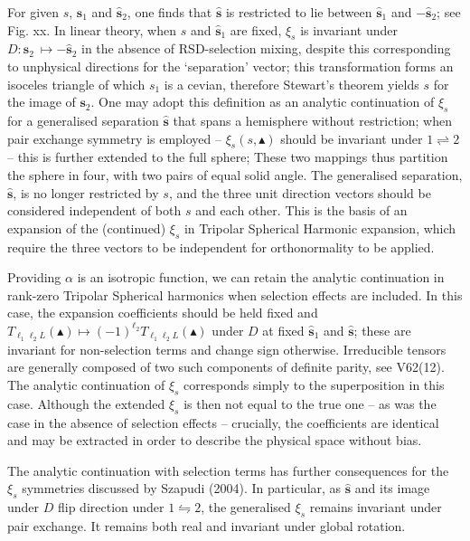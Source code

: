 \documentclass[useAMS,usenatbib]{mn2e}
\begin{document}
For given $s$, $\boldsymbol{\hat s}_1$ and $\boldsymbol{\hat s}_2$, one finds that $\boldsymbol{\hat s}$
is restricted to lie between $\boldsymbol{\hat s}_1$ and $- \boldsymbol{\hat s}_2$; see Fig. xx.  In linear theory, when $s$ and $\boldsymbol{\hat s}_1$ are fixed, $\xi_s$ is invariant under $D: \boldsymbol{\hat s}_2 \ \mapsto - \boldsymbol{\hat s}_2$ in the absence of RSD-selection mixing, despite this corresponding to unphysical directions for the `separation' vector; this transformation forms an isoceles triangle of which $s_1$ is a cevian, therefore Stewart's theorem yields $s$ for the image of $\boldsymbol{s}_2$.  One may adopt this definition as an analytic continuation of $\xi_s$ for a generalised separation $\boldsymbol{\hat s}$ that spans a hemisphere without restriction; when pair exchange symmetry is employed -- $\xi_s(s, \blacktriangle)$ should be invariant under $1 \rightleftharpoons 2$ -- this is further extended to the full sphere; These two mappings thus partition the sphere in four, with two pairs of equal solid angle.  The generalised separation, $\boldsymbol{\hat s}$, is no longer restricted by $s$, and the three unit direction vectors should be considered independent of both $s$ and each other.  This is the basis of an expansion of the (continued) $\xi_s$ in Tripolar Spherical Harmonic expansion, which require the three vectors to be independent for orthonormality to be applied.

Providing $\alpha$ is an isotropic function, we can retain the analytic continuation in rank-zero Tripolar Spherical harmonics when selection effects are included.  In this case, the expansion coefficients should be held fixed and $T_{\ell_1 \ell_2 L}(\blacktriangle) \mapsto (-1)^{\ell_2} T_{\ell_1 \ell_2 L}(\blacktriangle)$ under $D$ at fixed $\boldsymbol{\hat s}_1$ and $\boldsymbol{\hat s}$; these are invariant for non-selection terms and change sign otherwise.  Irreducible tensors are generally composed of two such components of definite parity, see V62(12).  The analytic continuation of $\xi_s$ corresponds simply to the superposition in this case.  Although the extended $\xi_s$ is then not equal to the true one -- as was the case in the absence of selection effects -- crucially, the coefficients are identical and may be extracted in order to describe the physical space without bias.

The analytic continuation with selection terms has further consequences for the $\xi_s$ symmetries discussed by Szapudi (2004).  In particular, as $\boldsymbol{\hat s}$ and its image under $D$ flip direction under $1 \leftrightharpoons 2$, the generalised $\xi_s$ remains invariant under pair exchange.  It remains both real and invariant under global rotation.
\end{document}
